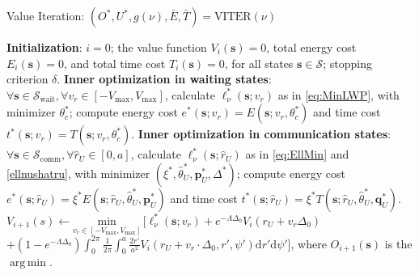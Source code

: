 \documentclass[12pt, draftcls, onecolumn]{IEEEtran}
\theoremstyle{plain}
\theoremstyle{definition}
\theoremstyle{remark}
\DeclareMathOperator*{\argmin}{arg\,min}
\begin{document}
\begin{algorithm}[t]
\caption{Value Iteration: $(O^{*},U^{*},g(\nu),\bar{E},\bar{T})=\mathrm{VITER}(\nu)$}\label{A1}
    \begin{algorithmic}[1]
        \State \textbf{Initialization}: $i{=}0$; the value function $V_{i}(\mathbf{s}){=}0$, total energy cost $E_{i}(\mathbf{s}){=}0$, and total time cost $T_{i}(\mathbf{s}){=}0$, for all states $\mathbf{s}{\in}\mathcal{S}$; stopping criterion $\delta$.
        \vspace{.2cm}
    	\State \textbf{Inner optimization in waiting states}: ${\forall}\mathbf{s}{\in}\mathcal{S}_{\mathrm{wait}}, {\forall}v_{r}{\in}[-V_{\mathrm{max}},V_{\mathrm{max}}]$, calculate $\ell_{\nu}^{*}(\mathbf{s};v_{r})$ as in \eqref{eq:MinLWP}, with minimizer $\theta_{c}^{*}$; compute energy cost $e^{*}(\mathbf{s};v_{r}){=}E(\mathbf{s};v_{r},\theta_{c}^*)$ and time cost $t^{*}(\mathbf{s};v_r){=}T(\mathbf{s};v_{r},\theta_{c}^{*})$.
    	\vspace{.2cm}
    	\State \textbf{Inner optimization in communication states}: ${\forall}\mathbf{s}{\in}\mathcal{S}_{\mathrm{comm}}, {\forall}\hat{r}_{U}{\in}[0,a]$, calculate $\ell_{\nu}^{*}(\mathbf{s};\hat{r}_{U})$ as in \eqref{eq:EllMin} and \eqref{ellnushatru}, with minimizer $(\xi^{*},\hat{\theta}_{U}^{*},\mathbf{p}_{U}^{*},\Delta^{*})$; compute energy cost $e^{*}(\mathbf{s};\hat{r}_{U}){=}\xi^{*}E(\mathbf{s};\hat{r}_{U},\hat{\theta}_{U}^{*},\mathbf{p}_{U}^{*})$ and time cost $t^{*}(\mathbf{s};\hat{r}_{U}){=}\xi^{*}T(\mathbf{s};\hat{r}_{U},\hat{\theta}_{U}^{*},\mathbf{q}_{U}^{*})$.
    	\vspace{.2cm}
        \Repeat
            \vspace{.2cm}
        	    \vspace{.2cm}
        		\State $V_{i{+}1}(s){\gets}\underset{v_{r}{\in}[-V_{\mathrm{max}},V_{\mathrm{max}}]}{\mathrm{min}}\, \big[\ell_{\nu}^{*}(\mathbf{s};v_{r}){+}e^{-\Lambda\Delta_{0}}V_{i}(r_{U}{+}v_{r}\Delta_{0})$ 
        		\vspace{.2cm}
        		\Statex \hspace{5.3cm} ${+} \left(1{-}e^{-\Lambda\Delta_{0}}\right)\int_{0}^{2\pi}\frac{1}{2\pi}\int_{0}^{a}\frac{2r'}{a^{2}}V_{i}(r_{U}{+}v_{r}{\cdot}\Delta_{0},r',\psi')\mathrm{d}r'\mathrm{d}\psi'\big]$,
        		\Statex \hspace{1.2cm} where $O_{i{+}1}(\mathbf{s})$ is the $\argmin$.
        		\vspace{.2cm}

\end{algorithmic}
\end{algorithm}
\end{document}
